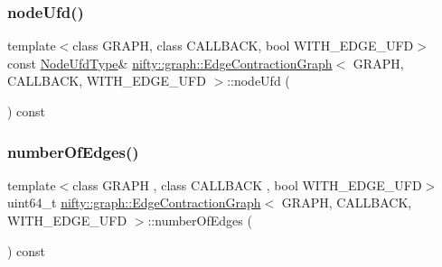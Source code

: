 \mbox{\label{classnifty_1_1graph_1_1EdgeContractionGraph_a3485f0d1574e28e96aab43d5e0b8c4c0}} 
\subsubsection{\texorpdfstring{node\+Ufd()}{nodeUfd()}}
{\footnotesize\ttfamily template$<$class G\+R\+A\+PH, class C\+A\+L\+L\+B\+A\+CK, bool W\+I\+T\+H\+\_\+\+E\+D\+G\+E\+\_\+\+U\+FD$>$ \\
const \hyperlink{classnifty_1_1graph_1_1EdgeContractionGraph_a7ff98238621f4b534e89b1880ee77239}{Node\+Ufd\+Type}\& \hyperlink{classnifty_1_1graph_1_1EdgeContractionGraph}{nifty\+::graph\+::\+Edge\+Contraction\+Graph}$<$ G\+R\+A\+PH, C\+A\+L\+L\+B\+A\+CK, W\+I\+T\+H\+\_\+\+E\+D\+G\+E\+\_\+\+U\+FD $>$\+::node\+Ufd (\begin{DoxyParamCaption}{ }\end{DoxyParamCaption}) const\hspace{0.3cm}{\ttfamily [inline]}}

\mbox{\label{classnifty_1_1graph_1_1EdgeContractionGraph_ad62c0b6483f0470dfe4d9af2f273d07a}} 
\subsubsection{\texorpdfstring{number\+Of\+Edges()}{numberOfEdges()}}
{\footnotesize\ttfamily template$<$class G\+R\+A\+PH , class C\+A\+L\+L\+B\+A\+CK , bool W\+I\+T\+H\+\_\+\+E\+D\+G\+E\+\_\+\+U\+FD$>$ \\
uint64\+\_\+t \hyperlink{classnifty_1_1graph_1_1EdgeContractionGraph}{nifty\+::graph\+::\+Edge\+Contraction\+Graph}$<$ G\+R\+A\+PH, C\+A\+L\+L\+B\+A\+CK, W\+I\+T\+H\+\_\+\+E\+D\+G\+E\+\_\+\+U\+FD $>$\+::number\+Of\+Edges (\begin{DoxyParamCaption}{ }\end{DoxyParamCaption}) const\hspace{0.3cm}{\ttfamily [inline]}}

